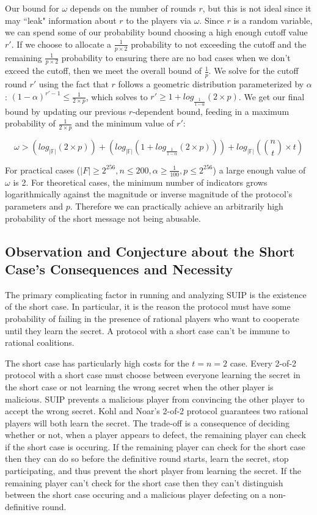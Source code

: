 \documentclass{dalcsthesis}
\begin{document}
Our bound for $\omega$ depends on the number of rounds $r$, but this is not ideal since it may ``leak" information about $r$ to the players via $\omega$. Since $r$ is a random variable, we can spend some of our probability bound choosing a high enough cutoff value $r'$. If we choose to allocate a $\frac{1}{p \times 2}$ probability to not exceeding the cutoff and the remaining $\frac{1}{p \times 2}$ probability to ensuring there are no bad cases when we don't exceed the cutoff, then we meet the overall bound of $\frac{1}{p}$. We solve for the cutoff round $r'$ using the fact that $r$ follows a geometric distribution parameterized by $\alpha$: $(1 - \alpha)^{r'-1} \leq \frac{1}{2 \times p}$, which solves to $r' \geq 1 + log_{\frac{1}{1-\alpha}}(2 \times p)$. We get our final bound by updating our previous $r$-dependent bound, feeding in a maximum probability of $\frac{1}{2 \times p}$ and the minimum value of $r'$:

$$\omega > (log_{|\mathbb{F}|} (2 \times p)) + (log_{|\mathbb{F}|} (1 + log_{\frac{1}{1-\alpha}}(2 \times p))) + log_{|\mathbb{F}|} (\binom{n}{t} \times t)$$

For practical cases ($|F| \geq 2^{256}, n \leq 200, \alpha \geq \frac{1}{100}, p \leq 2^{256}$) a large enough value of $\omega$ is 2. For theoretical cases, the minimum number of indicators grows logarithmically against the magnitude or inverse magnitude of the protocol's parameters and $p$. Therefore we can practically achieve an arbitrarily high probability of the short message not being abusable.

\subsection{Observation and Conjecture about the Short Case's Consequences and Necessity}

The primary complicating factor in running and analyzing SUIP is the existence of the short case. In particular, it is the reason the protocol must have some probability of failing in the presence of rational players who want to cooperate until they learn the secret. A protocol with a short case can't be immune to rational coalitions.

The short case has particularly high costs for the $t=n=2$ case. Every 2-of-2 protocol with a short case must choose between everyone learning the secret in the short case or not learning the wrong secret when the other player is malicious. SUIP prevents a malicious player from convincing the other player to accept the wrong secret. Kohl and Noar's 2-of-2 protocol \cite{kol08} guarantees two rational players will both learn the secret. The trade-off is a consequence of deciding whether or not, when a player appears to defect, the remaining player can check if the short case is occuring. If the remaining player can check for the short case then they can do so before the definitive round starts, learn the secret, stop participating, and thus prevent the short player from learning the secret. If the remaining player can't check for the short case then they can't distinguish between the short case occuring and a malicious player defecting on a non-definitive round.
\end{document}
